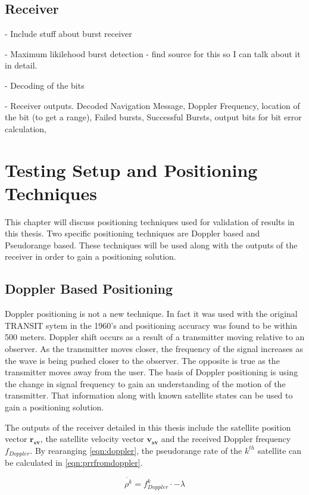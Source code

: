 \documentclass[12pt]{report}
\begin{document}
\section{Receiver}
- Include stuff about burst receiver

- Maximum likilehood burst detection
    - find source for this so I can talk about it in detail.

- Decoding of the bits

- Receiver outputs. Decoded Navigation Message, Doppler Frequency, location of the bit (to get a range), Failed bursts, Successful Bursts, output bits for bit error calculation,

\chapter{Testing Setup and Positioning Techniques}
This chapter will discuss positioning techniques used for validation of results in this thesis. Two specific positioning techniques are Doppler based and Pseudorange based. These techniques will be used along with the outputs of the receiver in order to gain a positioning solution.
 
\section{Doppler Based Positioning} \label{sec:DopplerPosTechnique}
Doppler positioning is not a new technique. In fact it was used with the original TRANSIT sytem in the 1960's and positioning accuracy was found to be within 500 meters. Doppler shift occurs as a result of a transmitter moving relative to an observer. As the transmitter moves closer, the frequency of the signal increases as the wave is being pushed closer to the observer. The opposite is true as the transmitter moves away from the user. The basis of Doppler positioning is using the change in signal frequency to gain an understanding of the motion of the transmitter. That information along with known satellite states can be used to gain a positioning solution.

The outputs of the receiver detailed in this thesis include the satellite position vector $\mathbf{r_{sv}}$, the satellite velocity vector $\mathbf{v_{sv}}$ and the received Doppler frequency $f_{Doppler}$. By rearanging \ref{eqn:doppler}, the pseudorange rate of the $k^{th}$ satellite can be calculated in \ref{eqn:prrfromdoppler}.

\begin{equation}
    \dot{\rho^{k}} = f_{Doppler}^{k} \cdot -\lambda
    \label{eqn:prrfromdoppler}
\end{equation}
\end{document}
